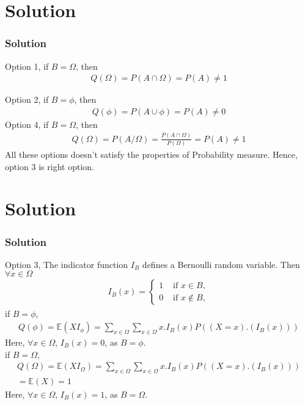 \documentclass{beamer}
\begin{document}
\section{Solution}
\begin{frame}
\frametitle{Solution}
Option 1, if $B= \Omega$, then
\begin{align}
    Q(\Omega) = P(A \cap \Omega) = P(A) \neq 1
\end{align}

Option 2, if $B= \phi$, then
\begin{align}
    Q(\phi) = P(A \cup \phi) = P(A) \neq 0
\end{align}
Option 4, if $B= \Omega$, then
\begin{align}
    Q(\Omega) = P(A/\Omega) = \frac{P(A \cap \Omega)}{P(\Omega)}
    = P(A)\neq 1
\end{align}
All these options doesn't satisfy the properties of Probability measure. Hence, option 3 is right option.
\end{frame}

\section{Solution}
\begin{frame}
\frametitle{Solution}
Option 3, The indicator function $I_{B}$ defines a Bernoulli random variable. Then $\forall x \in \Omega$ 
\begin{align}
I_{B}(x) = \begin{cases}
1 & \text{ if $x\in B$},\\
0 & \text{ if $x\notin B$},
\end{cases}
\end{align}
if $B=\phi$, 
\begin{align}
    Q(\phi) = \mathbb{E}(XI_{\phi}) = \sum_{x\in\Omega} \sum_{x\in\Omega} x.I_{B}(x)P((X=x).(I_{B}(x)))
\end{align}
Here, $\forall x \in \Omega$, $I_{B}(x)=0$, as $B=\phi$. \\
if $B=\Omega$, 
\begin{align}
    Q(\Omega) = \mathbb{E}(XI_{\Omega}) =\sum_{x\in\Omega} \sum_{x\in\Omega} x.I_{B}(x)P((X=x).(I_{B}(x))) \\= \mathbb{E}(X)=1
\end{align}
Here, $\forall x \in \Omega$, $I_{B}(x)=1$, as $B=\Omega$. \\
\end{frame}
\end{document}
